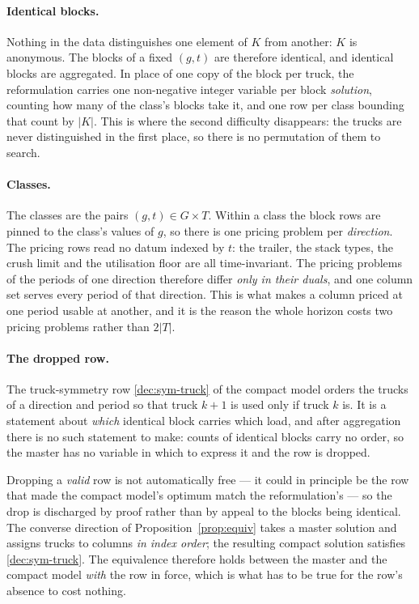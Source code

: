 \paragraph{Identical blocks.}
Nothing in the data distinguishes one element of $K$ from another: $K$
is anonymous. The blocks of a fixed $(g,t)$ are therefore identical,
and identical blocks are aggregated. In place of one copy of the block
per truck, the reformulation carries one non-negative integer variable
per block \emph{solution}, counting how many of the class's blocks take
it, and one row per class bounding that count by $|K|$. This is where
the second difficulty disappears: the trucks are never distinguished in
the first place, so there is no permutation of them to search.

\paragraph{Classes.}
The classes are the pairs $(g,t)\in G\times T$. Within a class the
block rows are pinned to the class's values of $g$, so there is one
pricing problem per \emph{direction}. The pricing rows read no datum
indexed by $t$: the trailer, the stack types, the crush limit and the
utilisation floor are all time-invariant. The pricing problems of the
periods of one direction therefore differ \emph{only in their duals},
and one column set serves every period of that direction. This is what
makes a column priced at one period usable at another, and it is the
reason the whole horizon costs two pricing problems rather than
$2|T|$.

\paragraph{The dropped row.}
The truck-symmetry row \eqref{dec:sym-truck} of the compact model
orders the trucks of a direction and period so that truck $k+1$ is used
only if truck $k$ is. It is a statement about \emph{which} identical
block carries which load, and after aggregation there is no such
statement to make: counts of identical blocks carry no order, so the
master has no variable in which to express it and the row is dropped.

Dropping a \emph{valid} row is not automatically free --- it could in
principle be the row that made the compact model's optimum match the
reformulation's --- so the drop is discharged by proof rather than by
appeal to the blocks being identical. The converse direction of
Proposition~\ref{prop:equiv} takes a master solution and assigns trucks
to columns \emph{in index order}; the resulting compact solution
satisfies \eqref{dec:sym-truck}. The equivalence therefore holds
between the master and the compact model \emph{with} the row in force,
which is what has to be true for the row's absence to cost nothing.

